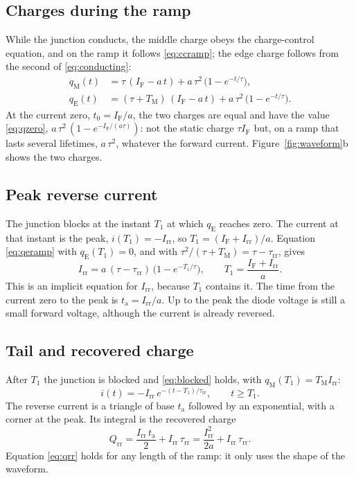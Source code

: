 \documentclass[10pt,a4paper]{scrartcl}
\newcommand{\IF}{I_\mathrm{F}}
\newcommand{\Irr}{I_\mathrm{rr}}
\newcommand{\Qrr}{Q_\mathrm{rr}}
\newcommand{\ta}{t_\mathrm{a}}
\newcommand{\taurr}{\tau_\mathrm{rr}}
\newcommand{\TM}{T_\mathrm{M}}
\newcommand{\Tone}{T_1}
\newcommand{\qE}{q_\mathrm{E}}
\newcommand{\qM}{q_\mathrm{M}}
\begin{document}
\subsection{Charges during the ramp}
While the junction conducts, the middle charge obeys the charge-control equation, and on the ramp it follows \eqref{eq:ccramp}; the edge charge follows from the second of \eqref{eq:conducting}:
\begin{align}
\qM(t) &= \tau\,(\IF - a\,t) + a\,\tau^2\,\bigl(1 - e^{-t/\tau}\bigr) , \label{eq:qmramp}\\
\qE(t) &= (\tau+\TM)\,(\IF - a\,t) + a\,\tau^2\,\bigl(1 - e^{-t/\tau}\bigr) . \label{eq:qeramp}
\end{align}
At the current zero, $t_0 = \IF/a$, the two charges are equal and have the value \eqref{eq:qzero}, $a\,\tau^2\,(1 - e^{-\IF/(a\tau)})$: not the static charge $\tau\IF$ but, on a ramp that lasts several lifetimes, $a\,\tau^2$, whatever the forward current. Figure~\ref{fig:waveform}b shows the two charges.
\subsection{Peak reverse current}
The junction blocks at the instant $\Tone$ at which $\qE$ reaches zero. The current at that instant is the peak, $i(\Tone) = -\Irr$, so $\Tone = (\IF+\Irr)/a$. Equation \eqref{eq:qeramp} with $\qE(\Tone) = 0$, and with $\tau^2/(\tau+\TM) = \tau - \taurr$, gives
\begin{equation}
\Irr = a\,(\tau-\taurr)\,\bigl(1 - e^{-\Tone/\tau}\bigr) , \qquad \Tone = \frac{\IF+\Irr}{a} .
\label{eq:peak}
\end{equation}
This is an implicit equation for $\Irr$, because $\Tone$ contains it. The time from the current zero to the peak is $\ta = \Irr/a$. Up to the peak the diode voltage is still a small forward voltage, although the current is already reversed.

\subsection{Tail and recovered charge}
After $\Tone$ the junction is blocked and \eqref{eq:blocked} holds, with $\qM(\Tone) = \TM\Irr$:
\begin{equation}
i(t) = -\Irr\,e^{-(t-\Tone)/\taurr} , \qquad t \geq \Tone .
\label{eq:tail}
\end{equation}
The reverse current is a triangle of base $\ta$ followed by an exponential, with a corner at the peak. Its integral is the recovered charge
\begin{equation}
\Qrr = \frac{\Irr\,\ta}{2} + \Irr\,\taurr = \frac{\Irr^2}{2a} + \Irr\,\taurr .
\label{eq:qrr}
\end{equation}
Equation \eqref{eq:qrr} holds for any length of the ramp: it only uses the shape of the waveform.
\end{document}
